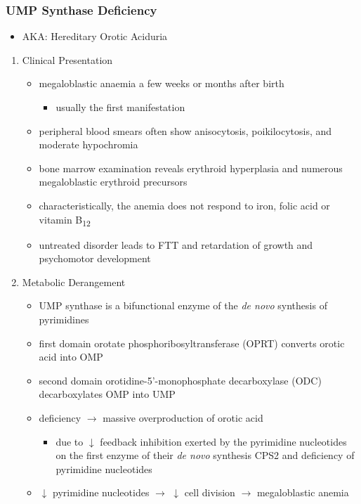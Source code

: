 \documentclass{scrartcl}
\begin{document}
\subsubsection{UMP Synthase Deficiency}
\label{sec:org71d10bc}
\begin{itemize}
\item AKA: Hereditary Orotic Aciduria
\end{itemize}
\begin{enumerate}
\item Clinical Presentation
\label{sec:orgcb857de}
\begin{itemize}
\item megaloblastic anaemia a few weeks or months after birth
\begin{itemize}
\item usually the first manifestation
\end{itemize}
\item peripheral blood smears often show anisocytosis, poikilocytosis, and
moderate hypochromia
\item bone marrow examination reveals erythroid hyperplasia and numerous
megaloblastic erythroid precursors
\item characteristically, the anemia does not respond to iron, folic acid
or vitamin B\textsubscript{12}
\item untreated disorder leads to FTT and retardation of growth and
psychomotor development
\end{itemize}

\item Metabolic Derangement
\label{sec:orgf426685}
\begin{itemize}
\item UMP synthase is a bifunctional enzyme of the \emph{de novo} synthesis of
pyrimidines
\item first domain orotate phosphoribosyltransferase (OPRT) converts
orotic acid into OMP
\item second domain orotidine-5’-monophosphate decarboxylase (ODC)
decarboxylates OMP into UMP
\end{itemize}
\begin{itemize}
\item deficiency \(\to\) massive overproduction of orotic acid
\begin{itemize}
\item due to \(\downarrow\) feedback inhibition exerted by the pyrimidine
nucleotides on the first enzyme of their \emph{de novo} synthesis CPS2
and deficiency of pyrimidine nucleotides
\end{itemize}
\item \(\downarrow\) pyrimidine nucleotides \(\to\) \(\downarrow\) cell division \(\to\)
megaloblastic anemia
\end{itemize}


\end{enumerate}
\end{document}
